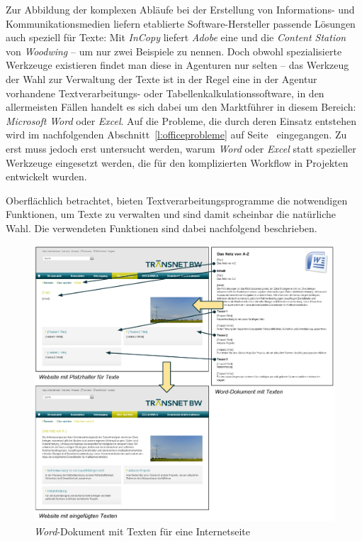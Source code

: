Zur Abbildung der komplexen Abläufe bei der Erstellung von Informations- und Kommunikationsmedien liefern etablierte Software-Hersteller passende Lösungen auch speziell für Texte: Mit \emph{InCopy} liefert \emph{Adobe} eine  \cite{adobeincopy} und  die \emph{Content Station} von \emph{Woodwing}  \cite{woodwing} -- um nur zwei Beispiele zu nennen. Doch obwohl spezialisierte Werkzeuge existieren findet man diese in Agenturen nur selten -- das Werkzeug der Wahl zur Verwaltung der Texte ist in der Regel eine in der Agentur vorhandene Textverarbeitungs- oder Tabellenkalkulationssoftware, in den allermeisten Fällen handelt es sich dabei um den Marktführer in diesem Bereich: \emph{Microsoft} \emph{Word} oder \emph{Excel}. Auf die Probleme, die durch deren Einsatz entstehen wird im nachfolgenden Abschnitt~\ref{l:officeprobleme} auf Seite~\pageref{l:officeprobleme} eingegangen. Zu erst muss jedoch erst untersucht werden, warum \emph{Word} oder \emph{Excel} statt spezieller Werkzeuge eingesetzt werden, die für den komplizierten Workflow in Projekten entwickelt wurden. 

Oberflächlich betrachtet, bieten Textverarbeitungsprogramme die notwendigen Funktionen, um Texte zu verwalten und sind damit scheinbar die natürliche Wahl. Die verwendeten Funktionen sind dabei nachfolgend beschrieben.

\begin{figure}[htb]
\begin{center}
\includegraphics[width=\textwidth]{media/Textbooklet-Word-Dokument.pdf}
\end{center}
\caption{\emph{Word}-Dokument mit Texten für eine Internetseite}
\label{f:wordbooklet}
\end{figure}

